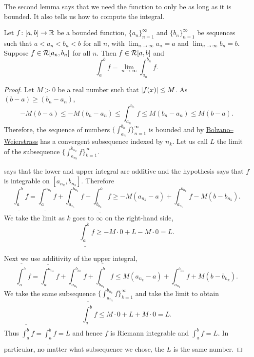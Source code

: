 The second lemma says that we need the function to only be  as long as it is bounded.  It also tells us how to
compute the integral.

\begin{lemma} \label{lemma:boundedimpriemann}
Let $f \colon [a,b] \to {\mathbb{R}}$ be a bounded function,
$\{ a_n \}_{n=1}^\infty$ and $\{b_n \}_{n=1}^\infty$ be sequences such that
$a < a_n < b_n < b$ for all $n$, with
$\lim_{n\to\infty} a_n = a$ and $\lim_{n\to\infty} b_n = b$.
Suppose $f \in {\mathcal{R}}[a_n,b_n]$ for all $n$.
Then $f \in {\mathcal{R}}[a,b]$ and
\begin{equation*}
\int_a^b f = 
\lim_{n \to \infty} \int_{a_n}^{b_n} f .
\end{equation*}
\end{lemma}

\begin{proof}
Let $M > 0$ be a real number such that $\left\lvert {f(x)} \right\rvert \leq M$.
As $(b-a) \geq (b_n-a_n)$,
\begin{equation*}
-M(b-a) \leq
-M(b_n-a_n) \leq
\int_{a_n}^{b_n} f
\leq
M(b_n-a_n) \leq
M(b-a) .
\end{equation*}
Therefore, the sequence of numbers
$\bigl\{ \int_{a_n}^{b_n} f \bigr\}_{n=1}^\infty$ is bounded and by
\hyperref[thm:bwseq]{Bolzano--Weierstrass}
has a convergent subsequence indexed by $n_k$.  Let us call
$L$ the limit of the subsequence
$\bigl\{ \int_{a_{n_k}}^{b_{n_k}} f \bigr\}_{k=1}^\infty$.

 says that
the lower and upper integral are additive
and the hypothesis says that
$f$ is integrable on $[a_{n_k},b_{n_k}]$.
Therefore
\begin{equation*}
\underline{\int_a^b} f
=
\underline{\int_a^{a_{n_k}}} f
+
\int_{a_{n_k}}^{b_{n_k}} f
+
\underline{\int_{b_{n_k}}^b} f
\geq
-M(a_{n_k}-a)
+
\int_{a_{n_k}}^{b_{n_k}} f
-
M(b-b_{n_k}) .
\end{equation*}
We take the limit as $k$ goes to $\infty$ on the right-hand side,
\begin{equation*}
\underline{\int_a^b} f
\geq
-M\cdot 0
+
L
-
M\cdot 0
= L .
\end{equation*}

Next we use additivity of the upper integral,
\begin{equation*}
\overline{\int_a^b} f
=
\overline{\int_a^{a_{n_k}}} f
+
\int_{a_{n_k}}^{b_{n_k}} f
+
\overline{\int_{b_{n_k}}^b} f
\leq
M(a_{n_k}-a)
+
\int_{a_{n_k}}^{b_{n_k}} f
+
M(b-b_{n_k}) .
\end{equation*}
We take the same subsequence 
$\{ \int_{a_{n_k}}^{b_{n_k}} f \}_{k=1}^\infty$ and take the limit 
to obtain
\begin{equation*}
\overline{\int_a^b} f
\leq
M\cdot 0
+
L
+
M\cdot 0
= L .
\end{equation*}
Thus $\overline{\int_a^b} f = \underline{\int_a^b} f = L$
and hence $f$ is Riemann integrable and $\int_a^b f = L$.
In particular, no matter what
subsequence we chose,
the $L$ is the same number.


\end{proof}
